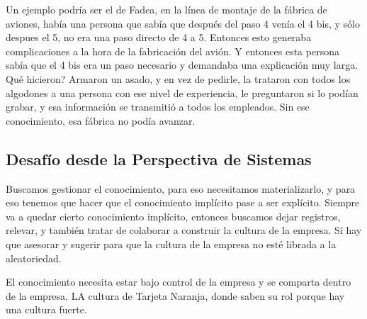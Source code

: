 Un ejemplo podría ser el de Fadea, en la línea de montaje de la fábrica
de aviones, había una persona que sabía que después del paso 4 venía el
4 bis, y sólo despues el 5, no era una paso directo de 4 a 5. Entonces
esto generaba complicaciones a la hora de la fabricación del avión. Y
entonces esta persona sabía que el 4 bis era un paso necesario y
demandaba una explicación muy larga. Qué hicieron? Armaron un asado, y
en vez de pedirle, la trataron con todos los algodones a una persona con
ese nivel de experiencia, le preguntaron si lo podían grabar, y esa
información se transmitió a todos los empleados. Sin ese conocimiento,
esa fábrica no podía avanzar.

\hypertarget{desafuxedo-desde-la-perspectiva-de-sistemas}{%
\subsection{Desafío desde la Perspectiva de
Sistemas}\label{desafuxedo-desde-la-perspectiva-de-sistemas}}

Buscamos gestionar el conocimiento, para eso necesitamos materializarlo,
y para eso tenemos que hacer que el conocimiento implícito pase a ser
explícito. Siempre va a quedar cierto conocimiento implícito, entonces
buscamos dejar registros, relevar, y también tratar de colaborar a
construir la cultura de la empresa. Sí hay que asesorar y sugerir para
que la cultura de la empresa no esté librada a la aleatoriedad.

El conocimiento necesita estar bajo control de la empresa y se comparta
dentro de la empresa. LA cultura de Tarjeta Naranja, donde saben su rol
porque hay una cultura fuerte.

\onecolumn
